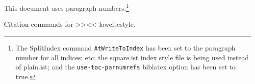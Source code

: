 



\newcommand\demofielddump[3][\newpage]{%
#1
\ifstrequal{#1}{\newpage}{\applymydcounter{#3}Fields for example \ref{mycite:#2}: \textbf{#2} --}{} \par

\bigskip
\fcolorbox{violet}{brown!20}{\parbox{0.8\textwidth}{\lcdcase{#2}}}
}














\renewcommand\lcparnumrefsencap{}
\p This document uses paragraph numbers.\footnote{The SplitIndex command \texttt{AtWriteToIndex} has been set to the paragraph number for all indices:  etc; the square.ist index style file is being used instead of plain.ist; and the \texttt{use-toc-parnumrefs} biblatex option has been set to true.}

\p Citation commands for >>\lccurrentstyle<< lawcitestyle.

